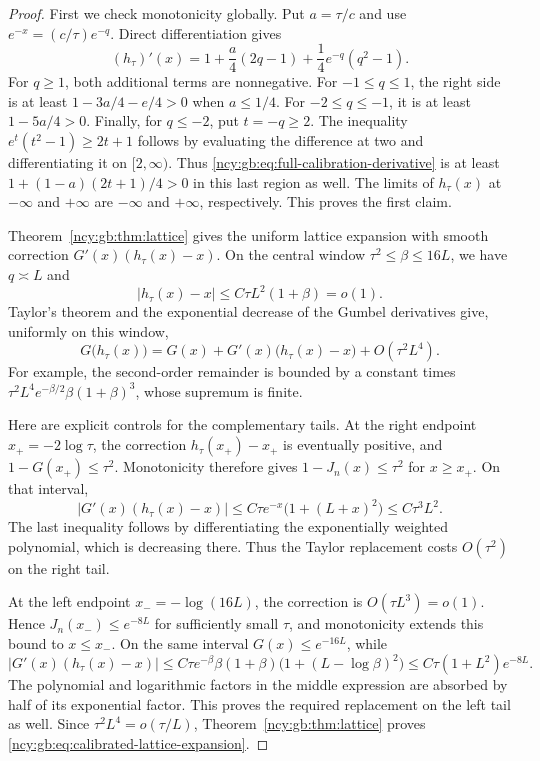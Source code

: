 \documentclass[11pt,letterpaper]{article}
\numberwithin{equation}{section}
\theoremstyle{remark}\newtheorem{remark}[theorem]{Remark}
\theoremstyle{definition}\newtheorem{definition}[theorem]{Definition}\theoremstyle{plain}
\begin{document}
\begin{proof}
First we check monotonicity globally.  Put $a=\tau/c$ and use
$e^{-x}=(c/\tau)e^{-q}$.  Direct differentiation gives
\begin{equation}
\label{ncy:gb:eq:full-calibration-derivative}
 (h_\tau)'(x)
  =1+\frac a4(2q-1)+\frac14e^{-q}(q^2-1).
\end{equation}
For $q\ge1$, both additional terms are nonnegative.
For $-1\le q\le1$, the right side is at least
$1-3a/4-e/4>0$ when $a\le1/4$.
For $-2\le q\le-1$, it is at least $1-5a/4>0$.
Finally, for $q\le-2$, put $t=-q\ge2$.  The inequality
$e^t(t^2-1)\ge2t+1$ follows by evaluating the difference at two
and differentiating it on $[2,\infty)$.  Thus
\eqref{ncy:gb:eq:full-calibration-derivative} is at least
$1+(1-a)(2t+1)/4>0$ in this last region as well.
The limits of $h_\tau(x)$ at $-\infty$ and $+\infty$ are
$-\infty$ and $+\infty$, respectively.  This proves the first claim.

Theorem~\ref{ncy:gb:thm:lattice} gives the uniform lattice expansion with
smooth correction $G'(x)(h_\tau(x)-x)$.
On the central window $\tau^2\le\beta\le16L$, we have
$q\asymp L$ and
\[
 |h_\tau(x)-x|\le C\tau L^2(1+\beta)=o(1).
\]
Taylor's theorem and the exponential decrease of the Gumbel derivatives
give, uniformly on this window,
\[
 G\bigl(h_\tau(x)\bigr)
 =G(x)+G'(x)\bigl(h_\tau(x)-x\bigr)+O(\tau^2L^4).
\]
For example, the second-order remainder is bounded by a constant times
$\tau^2L^4e^{-\beta/2}\beta(1+\beta)^3$, whose supremum is finite.

Here are explicit controls for the complementary tails.  At the right
endpoint $x_+=-2\log\tau$, the correction
$h_\tau(x_+)-x_+$ is eventually positive, and
$1-G(x_+)\le\tau^2$.  Monotonicity therefore gives
$1-J_n(x)\le\tau^2$ for $x\ge x_+$.
On that interval,
\[
 \bigl|G'(x)(h_\tau(x)-x)\bigr|
  \le C\tau e^{-x}\bigl(1+(L+x)^2\bigr)
  \le C\tau^3L^2.
\]
The last inequality follows by differentiating the exponentially
weighted polynomial, which is decreasing there.  Thus the Taylor
replacement costs $O(\tau^2)$ on the right tail.

At the left endpoint $x_-=-\log(16L)$, the correction is
$O(\tau L^3)=o(1)$.  Hence
$J_n(x_-)\le e^{-8L}$ for sufficiently small $\tau$,
and monotonicity extends this bound to $x\le x_-$.
On the same interval $G(x)\le e^{-16L}$, while
\[
 \bigl|G'(x)(h_\tau(x)-x)\bigr|
 \le C\tau e^{-\beta}\beta(1+\beta)
                   \bigl(1+(L-\log\beta)^2\bigr)
 \le C\tau(1+L^2)e^{-8L}.
\]
The polynomial and logarithmic factors in the middle expression are
absorbed by half of its exponential factor.  This proves the required
replacement on the left tail as well.  Since
$\tau^2L^4=o(\tau/L)$,
Theorem~\ref{ncy:gb:thm:lattice} proves
\eqref{ncy:gb:eq:calibrated-lattice-expansion}.


\end{proof}
\end{document}
